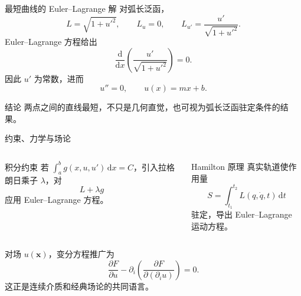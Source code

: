 \begin{frame}{最短曲线的 Euler--Lagrange 解}
  对弧长泛函，
  \[
    L=\sqrt{1+u'^2},\qquad L_u=0,
    \qquad L_{u'}=\frac{u'}{\sqrt{1+u'^2}}.
  \]
  Euler--Lagrange 方程给出
  \[
    \frac{\mathrm{d}}{\mathrm{d}x}
    \left(\frac{u'}{\sqrt{1+u'^2}}\right)=0.
  \]
  因此 $u'$ 为常数，进而
  \[
    u''=0,\qquad u(x)=mx+b.
  \]
  \begin{alertblock}{结论}
    两点之间的直线最短，不只是几何直觉，也可视为弧长泛函驻定条件的结果。
  \end{alertblock}
\end{frame}

\begin{frame}{约束、力学与场论}
  \begin{columns}[T]
    \begin{block}{积分约束}
      若 $\int_a^bg(x,u,u')\,\mathrm{d}x=C$，引入拉格朗日乘子 $\lambda$，对
      \[
        L+\lambda g
      \]
      应用 Euler--Lagrange 方程。
    \end{block}
    \begin{block}{Hamilton 原理}
      真实轨道使作用量
      \[
        S=\int_{t_1}^{t_2}L(q,\dot q,t)\,\mathrm{d}t
      \]
      驻定，导出 Euler--Lagrange 运动方程。
    \end{block}
  \end{columns}
  对场 $u(\mathbf{x})$，变分方程推广为
  \[
    \frac{\partial F}{\partial u}-
    \partial_i\left(\frac{\partial F}{\partial(\partial_i u)}\right)=0.
  \]
  这正是连续介质和经典场论的共同语言。
\end{frame}
